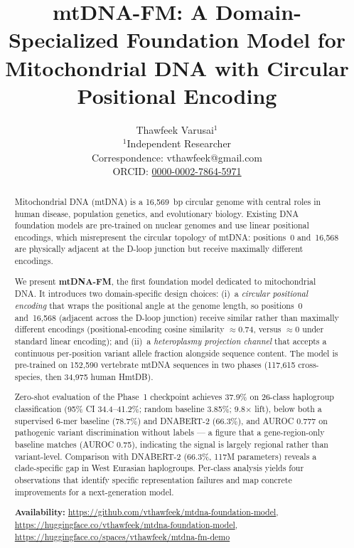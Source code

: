 \documentclass[10pt]{article}
\begin{document}
\title{\textbf{mtDNA-FM: A Domain-Specialized Foundation Model for Mitochondrial DNA
       with Circular Positional Encoding}}

\author{
  Thawfeek Varusai$^{1}$\\
  \small $^{1}$Independent Researcher \\
  \small Correspondence: vthawfeek@gmail.com\\
  \small ORCID: \href{https://orcid.org/0000-0002-7864-5971}{0000-0002-7864-5971}
}
\date{}
\maketitle

\begin{abstract}
Mitochondrial DNA (mtDNA) is a 16,569~bp circular genome with central roles in human disease,
population genetics, and evolutionary biology. Existing DNA foundation models are pre-trained on
nuclear genomes and use linear positional encodings, which misrepresent the circular topology of
mtDNA: positions~0 and~16,568 are physically adjacent at the D-loop junction but receive
maximally different encodings.

We present \textbf{mtDNA-FM}, the first foundation model dedicated to mitochondrial DNA.
It introduces two domain-specific design choices: (i)~a \textit{circular positional encoding}
that wraps the positional angle at the genome length, so positions~0 and~16,568 (adjacent across
the D-loop junction) receive similar rather than maximally different encodings
(positional-encoding cosine similarity $\approx$0.74, versus $\approx$0 under standard linear
encoding); and (ii)~a
\textit{heteroplasmy projection channel} that accepts a continuous per-position variant allele
fraction alongside sequence content.
The model is pre-trained on 152,590 vertebrate mtDNA sequences in two phases
(117,615 cross-species, then 34,975 human HmtDB).

Zero-shot evaluation of the Phase~1 checkpoint achieves 37.9\% on 26-class haplogroup
classification (95\% CI 34.4--41.2\%; random baseline 3.85\%; 9.8$\times$ lift), below both a
supervised 6-mer baseline (78.7\%) and DNABERT-2 (66.3\%), and AUROC 0.777 on pathogenic variant
discrimination without labels --- a figure that a gene-region-only baseline matches (AUROC 0.75),
indicating the signal is largely regional rather than variant-level.
Comparison with DNABERT-2 (66.3\%, 117M parameters) reveals a clade-specific gap in
West Eurasian haplogroups. Per-class analysis yields four observations that identify
specific representation failures and map concrete improvements for a next-generation model.

\textbf{Availability:} \url{https://github.com/vthawfeek/mtdna-foundation-model},
\url{https://huggingface.co/vthawfeek/mtdna-foundation-model},
\url{https://huggingface.co/spaces/vthawfeek/mtdna-fm-demo}
\end{abstract}
\end{document}
